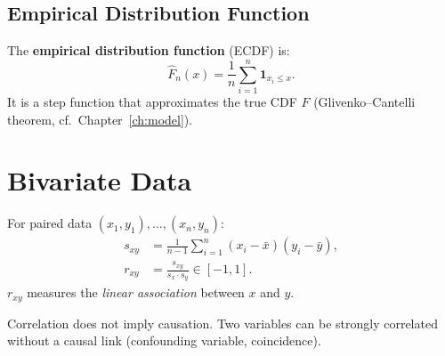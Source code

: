 \subsection{Empirical Distribution Function}

\begin{definition}
The \textbf{empirical distribution function} (ECDF) is:
\[
\hat{F}_n(x) = \frac{1}{n}\sum_{i=1}^n \mathbf{1}_{x_i \leq x}.
\]
It is a step function that approximates the true CDF $F$ (Glivenko--Cantelli theorem, cf.\ Chapter~\ref{ch:model}).
\end{definition}

\section{Bivariate Data}

\begin{definition}
For paired data $(x_1,y_1),\ldots,(x_n,y_n)$:
\begin{align}
s_{xy} &= \frac{1}{n-1}\sum_{i=1}^n (x_i-\bar{x})(y_i-\bar{y}), \\
r_{xy} &= \frac{s_{xy}}{s_x\cdot s_y} \in [-1,1].
\end{align}
$r_{xy}$ measures the \emph{linear association} between $x$ and $y$.
\end{definition}

\begin{warning}
Correlation does not imply causation. Two variables can be strongly correlated without a causal link (confounding variable, coincidence).
\end{warning}

